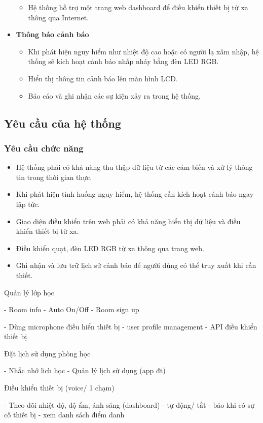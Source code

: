 \begin{itemize}
\begin{itemize}
              \item Hệ thống hỗ trợ một trang web dashboard để điều khiển thiết bị từ xa thông qua Internet.
          \end{itemize}
    \item \textbf{Thông báo cảnh báo}
          \begin{itemize}
              \item Khi phát hiện nguy hiểm như nhiệt độ cao hoặc có người lạ xâm nhập, hệ thống sẽ kích hoạt cảnh báo nhấp nháy bằng đèn LED RGB.
              \item Hiển thị thông tin cảnh báo lên màn hình LCD.
              \item Báo cáo và ghi nhận các sự kiện xảy ra trong hệ thống.
          \end{itemize}
\end{itemize}

\subsection{Yêu cầu của hệ thống}
\subsubsection{Yêu cầu chức năng}
\begin{itemize}
    \item Hệ thống phải có khả năng thu thập dữ liệu từ các cảm biến và xử lý thông tin trong thời gian thực.
    \item Khi phát hiện tình huống nguy hiểm, hệ thống cần kích hoạt cảnh báo ngay lập tức.
    \item Giao diện điều khiển trên web phải có khả năng hiển thị dữ liệu và điều khiển thiết bị từ xa.
    \item Điều khiển quạt, đèn LED RGB từ xa thông qua trang web.
    \item Ghi nhận và lưu trữ lịch sử cảnh báo để người dùng có thể truy xuất khi cần thiết.
\end{itemize}
Quản lý lớp học

- Room info
- Auto On/Off
- Room sign up

- Dùng microphone điều hiển thiết bị
- user profile management
- API điều khiển thiết bị

Đặt lịch sử dụng phòng học

- Nhắc nhở lich học
- Quản lý lịch sử dụng (app đt)

Điều khiển thiết bị (voice/ 1 chạm)

- Theo dõi nhiệt độ, độ ẩm, ánh sáng (dashboard)
- tự động/ tắt
- báo khi có sự cố thiết bị
- xem danh sách điểm danh

